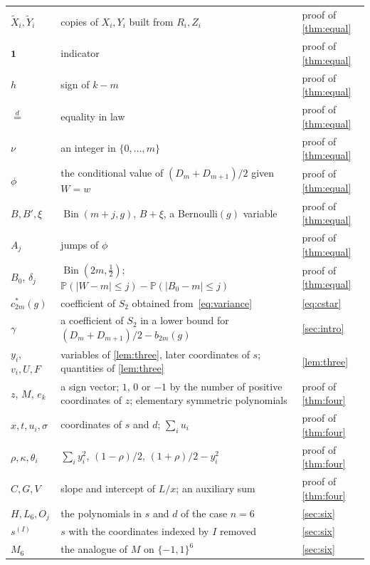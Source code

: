 \documentclass[11pt,a4paper]{article}
\numberwithin{equation}{section}
\theoremstyle{remark}
\newcommand{\Pp}{\mathbb P}
\newcommand{\Bin}{\operatorname{Bin}}
\begin{document}
\begin{center}
\begin{tabular}{p{}p{}p{}}
$\widetilde X_i,\widetilde Y_i$ & copies of $X_i,Y_i$ built from $R_i,Z_i$ & proof of \cref{thm:equal}\\
$\mathbf 1$ & indicator & proof of \cref{thm:equal}\\
$h$ & sign of $k-m$ & proof of \cref{thm:equal}\\
$\overset d=$ & equality in law & proof of \cref{thm:equal}\\
$\nu$ & an integer in $\{0,\dots,m\}$ & proof of \cref{thm:equal}\\
$\phi$ & the conditional value of $(D_m+D_{m+1})/2$ given $W=w$ & proof of \cref{thm:equal}\\
$B,B',\xi$ & $\Bin(m+j,g)$, $B+\xi$, a Bernoulli$(g)$ variable & proof of \cref{thm:equal}\\
$A_j$ & jumps of $\phi$ & proof of \cref{thm:equal}\\
$B_0$, $\delta_j$ & $\Bin(2m,\frac12)$; $\Pp(|W-m|\le j)-\Pp(|B_0-m|\le j)$ & proof of \cref{thm:equal}\\
$c^*_{2m}(g)$ & coefficient of $S_2$ obtained from~\eqref{eq:variance} & \eqref{eq:cstar}\\
$\gamma$ & a coefficient of $S_2$ in a lower bound for $(D_m+D_{m+1})/2-b_{2m}(g)$ & \cref{sec:intro}\\
$y_i$, $v_i,U,F$ & variables of \cref{lem:three}, later coordinates of $s$; quantities of \cref{lem:three} & \cref{lem:three}\\
$z$, $M$, $e_k$ & a sign vector; $1$, $0$ or $-1$ by the number of positive coordinates of $z$; elementary symmetric polynomials & proof of \cref{thm:four}\\
$x,t,u_i,\sigma$ & coordinates of $s$ and $d$; $\sum_iu_i$ & proof of \cref{thm:four}\\
$\rho,\kappa,\theta_i$ & $\sum_iy_i^2$, $(1-\rho)/2$, $(1+\rho)/2-y_i^2$ & proof of \cref{thm:four}\\
$C,G,V$ & slope and intercept of $L/x$; an auxiliary sum & proof of \cref{thm:four}\\
$H,L_6,O_j$ & the polynomials in $s$ and $d$ of the case $n=6$ & \cref{sec:six}\\
$s^{(I)}$ & $s$ with the coordinates indexed by $I$ removed & \cref{sec:six}\\
$M_6$ & the analogue of $M$ on $\{-1,1\}^6$ & \cref{sec:six}\\
\bottomrule
\end{tabular}
\end{center}
\end{document}
